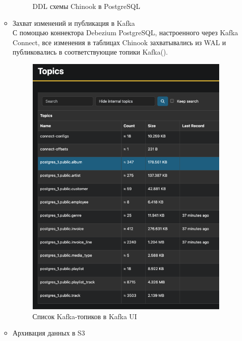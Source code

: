 \begin{enumerate}[1.]
\begin{itemize}
\begin{figure}[h]
                  \caption{DDL схемы Chinook в PostgreSQL}
                  \label{fig:ex2_schema_ddl}
                \end{figure}
                \FloatBarrier
          \item Захват изменений и публикация в Kafka \\
                С помощью коннектора Debezium PostgreSQL, настроенного через Kafka Connect, все изменения в таблицах Chinook захватывались из WAL и публиковались в соответствующие топики Kafka().
                \begin{figure}[h]
                  \center
                  \includegraphics [scale=0.5] {my_folder/images/ex2_kafka_topics}
                  \caption{Список Kafka-топиков в Kafka UI}
                  \label{fig:ex2_kafka_topics}
                \end{figure}
                \FloatBarrier
          \item Архивация данных в S3\\

\end{itemize}
\end{enumerate}

